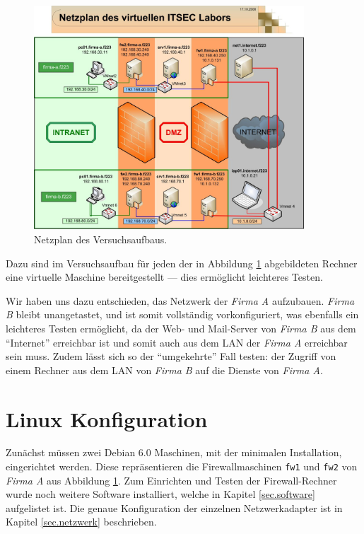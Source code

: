 \begin{figure}[h!]
  \centering
    \includegraphics[width=0.9\textwidth]{figures/Netzplan.jpg}
  \caption{Netzplan des Versuchsaufbaus.\cite{labor}}
  \label{fig.netzplan}
\end{figure}

Dazu sind im Versuchsaufbau für jeden der in Abbildung 
\ref{fig.netzplan} abgebildeten Rechner
eine virtuelle Maschine bereitgestellt --- dies ermöglicht leichteres
Testen.

Wir haben uns dazu entschieden, das Netzwerk der \emph{Firma A} aufzubauen.
\emph{Firma B} bleibt unangetastet, und ist somit vollständig vorkonfiguriert,
was ebenfalls ein leichteres Testen ermöglicht, da der Web- und Mail-Server von
\emph{Firma B} aus dem "`Internet"' erreichbar ist und somit auch aus dem LAN
der \emph{Firma A} erreichbar sein muss.
Zudem lässt sich so der "`umgekehrte"' Fall testen: der Zugriff von einem
Rechner aus dem LAN von \emph{Firma B} auf die Dienste von
\emph{Firma A}.\cite{labor}


\section{Linux Konfiguration}

Zunächst müssen zwei Debian 6.0 Maschinen,
mit der minimalen Installation, eingerichtet werden.
Diese repräsentieren die Firewallmaschinen {\tt fw1} und {\tt fw2} von
\emph{Firma A} aus Abbildung \ref{fig.netzplan}.
Zum Einrichten und Testen der Firewall-Rechner wurde noch weitere Software
installiert, welche in Kapitel \ref{sec.software} aufgelistet ist.
Die genaue Konfiguration der einzelnen Netzwerkadapter ist in Kapitel
\ref{sec.netzwerk} beschrieben.



